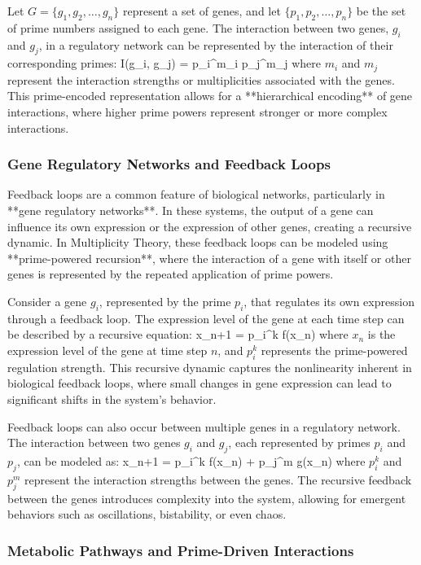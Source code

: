 \documentclass[12pt]{article}
\begin{document}
Let \( G = \{g_1, g_2, \dots, g_n\} \) represent a set of genes, and let \( \{p_1, p_2, \dots, p_n\} \) be the set of prime numbers assigned to each gene. The interaction between two genes, \( g_i \) and \( g_j \), in a regulatory network can be represented by the interaction of their corresponding primes:
\]
I(g_i, g_j) = p_i^{m_i} p_j^{m_j}
\]
where \( m_i \) and \( m_j \) represent the interaction strengths or multiplicities associated with the genes. This prime-encoded representation allows for a **hierarchical encoding** of gene interactions, where higher prime powers represent stronger or more complex interactions.

\subsubsection{Gene Regulatory Networks and Feedback Loops}

Feedback loops are a common feature of biological networks, particularly in **gene regulatory networks**. In these systems, the output of a gene can influence its own expression or the expression of other genes, creating a recursive dynamic. In Multiplicity Theory, these feedback loops can be modeled using **prime-powered recursion**, where the interaction of a gene with itself or other genes is represented by the repeated application of prime powers.

Consider a gene \( g_i \), represented by the prime \( p_i \), that regulates its own expression through a feedback loop. The expression level of the gene at each time step can be described by a recursive equation:
\]
x_{n+1} = p_i^k f(x_n)
\]
where \( x_n \) is the expression level of the gene at time step \( n \), and \( p_i^k \) represents the prime-powered regulation strength. This recursive dynamic captures the nonlinearity inherent in biological feedback loops, where small changes in gene expression can lead to significant shifts in the system's behavior.

Feedback loops can also occur between multiple genes in a regulatory network. The interaction between two genes \( g_i \) and \( g_j \), each represented by primes \( p_i \) and \( p_j \), can be modeled as:
\]
x_{n+1} = p_i^k f(x_n) + p_j^m g(x_n)
\]
where \( p_i^k \) and \( p_j^m \) represent the interaction strengths between the genes. The recursive feedback between the genes introduces complexity into the system, allowing for emergent behaviors such as oscillations, bistability, or even chaos.

\subsubsection{Metabolic Pathways and Prime-Driven Interactions}
\end{document}
